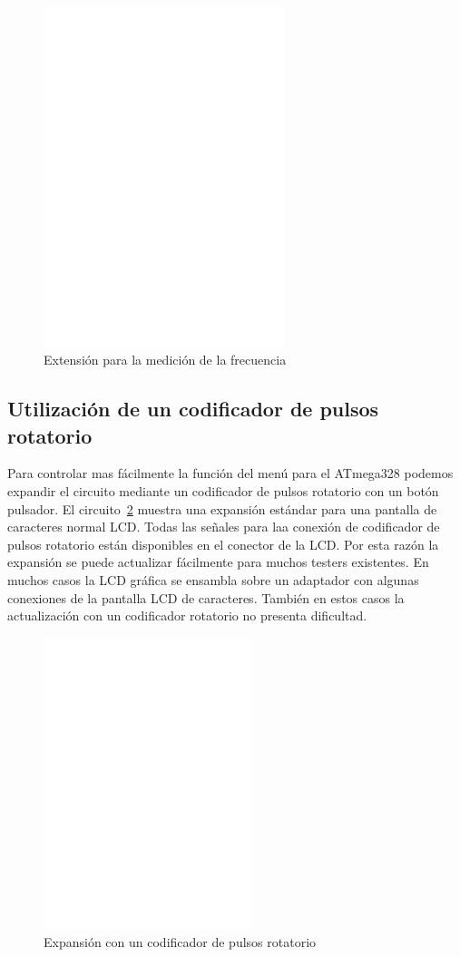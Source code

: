 \begin{figure}[H]
\centering
\includegraphics[width=7cm]{../FIG/Frequency_addon.eps}
\caption{Extensión para la medición de la frecuencia}
\label{fig:FreqMes}
\end{figure}

\subsection{Utilización de un codificador de pulsos rotatorio}

Para  controlar mas  fácilmente la  función del  menú  para el  ATmega328 podemos  expandir el  circuito mediante  un
codificador de pulsos  rotatorio con un botón  pulsador. El circuito~\ref{fig:RotExt} muestra  una expansión estándar
para una pantalla  de caracteres normal LCD.  Todas las señales para  laa conexión de codificador  de pulsos rotatorio
están disponibles en el conector  de la LCD. Por esta razón la expansión se  puede actualizar fácilmente para muchos
testers existentes. En muchos casos la LCD gráfica se ensambla sobre un adaptador con algunas conexiones de la pantalla
LCD de caracteres. También en estos casos la actualización con un codificador rotatorio no presenta dificultad.

\begin{figure}[H]
\centering
\includegraphics[width=6cm]{../FIG/rotary_extension.eps}
\caption{Expansión con un codificador de pulsos rotatorio}
\label{fig:RotExt}
\end{figure}

